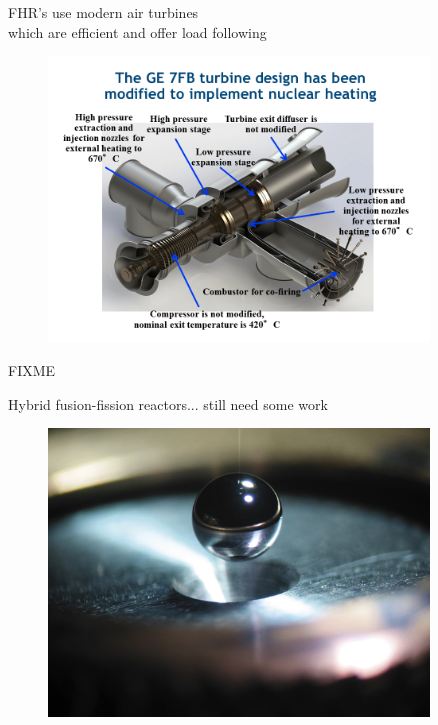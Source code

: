 \documentclass{beamer}
\begin{document}
        \begin{frame}{FHR's use modern air turbines \\ which are efficient and offer load following}
            \begin{figure}
                \centering
                \includegraphics[width=0.9\textwidth]{./img/fhrPower.png}
                \caption*{}
            \end{figure}
        \end{frame}

        FIXME

        \begin{frame}{Hybrid fusion-fission reactors}{... still need some work}
            \begin{figure}
                \centering
                \includegraphics[width=0.9\textwidth]{./img/lifeFuel.png}
                \caption*{}
            \end{figure}
        \end{frame}
\end{document}
